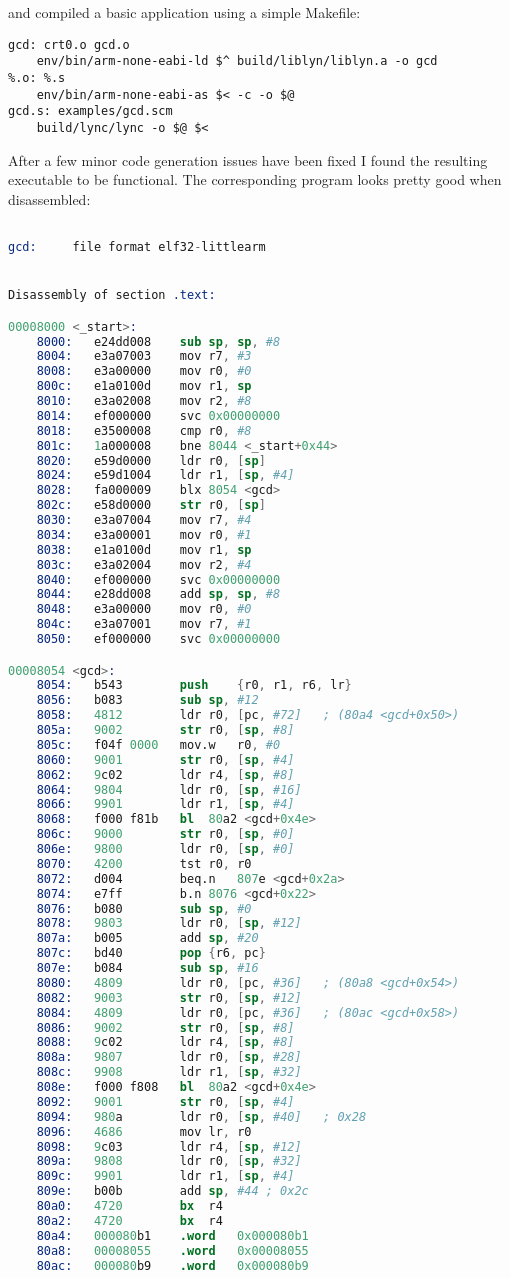 \documentclass[12pt, article]{article}
\begin{document}
and compiled a basic application using a simple Makefile:
\begin{lstlisting}
gcd: crt0.o gcd.o
	env/bin/arm-none-eabi-ld $^ build/liblyn/liblyn.a -o gcd
%.o: %.s
	env/bin/arm-none-eabi-as $< -c -o $@
gcd.s: examples/gcd.scm
	build/lync/lync -o $@ $<
\end{lstlisting}

After a few minor code generation issues have been fixed I found the
resulting executable to be functional.
The corresponding program looks pretty good when disassembled:
\begin{lstlisting}[language=Assembler, basicstyle=\footnotesize]

gcd:     file format elf32-littlearm


Disassembly of section .text:

00008000 <_start>:
    8000:	e24dd008 	sub	sp, sp, #8
    8004:	e3a07003 	mov	r7, #3
    8008:	e3a00000 	mov	r0, #0
    800c:	e1a0100d 	mov	r1, sp
    8010:	e3a02008 	mov	r2, #8
    8014:	ef000000 	svc	0x00000000
    8018:	e3500008 	cmp	r0, #8
    801c:	1a000008 	bne	8044 <_start+0x44>
    8020:	e59d0000 	ldr	r0, [sp]
    8024:	e59d1004 	ldr	r1, [sp, #4]
    8028:	fa000009 	blx	8054 <gcd>
    802c:	e58d0000 	str	r0, [sp]
    8030:	e3a07004 	mov	r7, #4
    8034:	e3a00001 	mov	r0, #1
    8038:	e1a0100d 	mov	r1, sp
    803c:	e3a02004 	mov	r2, #4
    8040:	ef000000 	svc	0x00000000
    8044:	e28dd008 	add	sp, sp, #8
    8048:	e3a00000 	mov	r0, #0
    804c:	e3a07001 	mov	r7, #1
    8050:	ef000000 	svc	0x00000000

00008054 <gcd>:
    8054:	b543      	push	{r0, r1, r6, lr}
    8056:	b083      	sub	sp, #12
    8058:	4812      	ldr	r0, [pc, #72]	; (80a4 <gcd+0x50>)
    805a:	9002      	str	r0, [sp, #8]
    805c:	f04f 0000 	mov.w	r0, #0
    8060:	9001      	str	r0, [sp, #4]
    8062:	9c02      	ldr	r4, [sp, #8]
    8064:	9804      	ldr	r0, [sp, #16]
    8066:	9901      	ldr	r1, [sp, #4]
    8068:	f000 f81b 	bl	80a2 <gcd+0x4e>
    806c:	9000      	str	r0, [sp, #0]
    806e:	9800      	ldr	r0, [sp, #0]
    8070:	4200      	tst	r0, r0
    8072:	d004      	beq.n	807e <gcd+0x2a>
    8074:	e7ff      	b.n	8076 <gcd+0x22>
    8076:	b080      	sub	sp, #0
    8078:	9803      	ldr	r0, [sp, #12]
    807a:	b005      	add	sp, #20
    807c:	bd40      	pop	{r6, pc}
    807e:	b084      	sub	sp, #16
    8080:	4809      	ldr	r0, [pc, #36]	; (80a8 <gcd+0x54>)
    8082:	9003      	str	r0, [sp, #12]
    8084:	4809      	ldr	r0, [pc, #36]	; (80ac <gcd+0x58>)
    8086:	9002      	str	r0, [sp, #8]
    8088:	9c02      	ldr	r4, [sp, #8]
    808a:	9807      	ldr	r0, [sp, #28]
    808c:	9908      	ldr	r1, [sp, #32]
    808e:	f000 f808 	bl	80a2 <gcd+0x4e>
    8092:	9001      	str	r0, [sp, #4]
    8094:	980a      	ldr	r0, [sp, #40]	; 0x28
    8096:	4686      	mov	lr, r0
    8098:	9c03      	ldr	r4, [sp, #12]
    809a:	9808      	ldr	r0, [sp, #32]
    809c:	9901      	ldr	r1, [sp, #4]
    809e:	b00b      	add	sp, #44	; 0x2c
    80a0:	4720      	bx	r4
    80a2:	4720      	bx	r4
    80a4:	000080b1 	.word	0x000080b1
    80a8:	00008055 	.word	0x00008055
    80ac:	000080b9 	.word	0x000080b9


\end{lstlisting}
\end{document}
